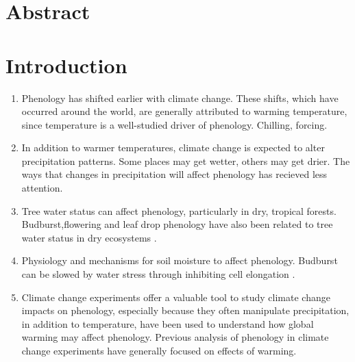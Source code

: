 \documentclass{article}
\begin{document}
\begin{singlespace}
\end{singlespace}


\clearpage
\section*{Abstract}

\section* {Introduction}
\begin{singlespace}
\begin{enumerate}
\item Phenology has shifted earlier with climate change. These shifts, which have occurred around the world, are generally attributed to warming temperature, since temperature is a well-studied driver of phenology.  Chilling, forcing. 
\item In addition to warmer temperatures, climate change is expected to alter precipitation patterns. Some places may get wetter, others may get drier. The ways that changes in precipitation will affect phenology has recieved less attention. 
\item Tree water status can affect phenology, particularly in dry, tropical forests. Budburst,flowering and leaf drop phenology have also been related to tree water status in dry ecosystems \citep{essiamah1986,reich1984, van1993}. 
\item Physiology and mechanisms for soil moisture to affect phenology. Budburst can be slowed by water stress through inhibiting cell elongation \citep{essiamah1986}.
\item Climate change experiments offer a valuable tool to study climate change impacts on phenology, especially because they often manipulate precipitation, in addition to temperature, have been used to understand how global warming may affect phenology. Previous analysis of phenology in climate change experiments have generally focused on effects of warming. 


\end{enumerate}
\end{singlespace}
\end{document}
